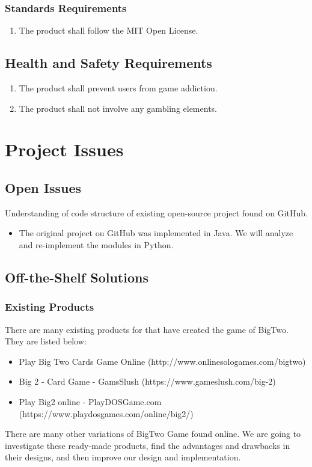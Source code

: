 \documentclass[12pt, titlepage]{article}
\begin{document}
\subsubsection{Standards Requirements}
\begin{enumerate}
    \item The product shall follow the MIT Open License.
\end{enumerate}

\subsection{Health and Safety Requirements}
\begin{enumerate}
    \item The product shall prevent users from game addiction.
    \item The product shall not involve any gambling elements.
\end{enumerate}


\section{Project Issues}

\subsection{Open Issues}
Understanding of code structure of existing open-source project found on GitHub.
\begin{itemize}
    \item The original project on GitHub was implemented in Java. We will analyze and re-implement the modules in Python.
\end{itemize}
\subsection{Off-the-Shelf Solutions}
\subsubsection{Existing Products}
There are many existing products for that have created the game of BigTwo. They are listed below:
\begin{itemize}
    \item Play Big Two Cards Game Online (http://www.onlinesologames.com/bigtwo)
    \item Big 2 - Card Game - GamsSlush (https://www.gameslush.com/big-2)
    \item Play Big2 online - PlayDOSGame.com (https://www.playdosgames.com/online/big2/)
\end{itemize}
There are many other variations of BigTwo Game found online. We are going to investigate these ready-made products, find the advantages and drawbacks in their designs, and then improve our design and implementation.
\end{document}
